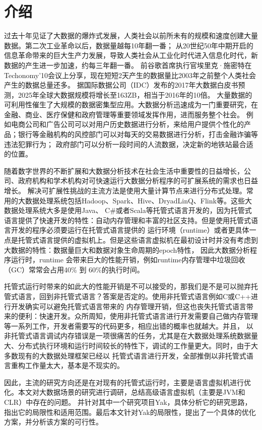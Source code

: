 
\chapter{介绍}
过去十年见证了大数据的爆炸式发展，人类社会以前所未有的规模和速度创建大量数据。第二次工业革命以后，数据量越每10年翻一番；
从20世纪50年中期开启的信息革命带来的巨大生产力发展，导致人类社会从工业化时代进入信息化时代，新数据的产生进一步加速，约每三年翻一番。
前谷歌首席执行官埃里克·施密特在Techonomy'10会议上分享，现在短短2天产生的数据量比2003年之前整个人类社会产生的数据总量还多。
据国际数据公司（IDC）发布的2017年大数据白皮书预测\cite{reinsel2017data}，2025年全球大数据规模将增长至163ZB，相当于2016年的10倍。
大量数据的可利用性催生了大规模的数据密集型应用。大数据分析迅速成为一门重要研究，在金融、商业、医疗保健和政府管理等重要领域发挥作用，进而服务整个社会。
例如电商公司和广告公司可以对用户历史数据进行分析，来给用户提供个性化的产品；银行等金融机构的风控部门可以对每天的交易数据进行分析，打击金融诈骗等违法犯罪行为；
政府部门可以分析一段时间的人流数据，决定新的地铁站最合适的位置。

随着数字世界的不断扩展和大数据分析技术在社会生活中重要性的日益增长，公司、政府机构和学术机构对可快速运行大数据分析程序的可扩展系统的需求也日益增长。
解决可扩展性挑战的主流方法是使用大量计算节点来进行分布式处理。常用的大数据处理系统包括Hadoop\cite{hadoop}、Spark\cite{spark}、Hive\cite{hive}、DryadLinQ\cite{dryadLinQ}、Flink\cite{flink}等。这些大数据处理系统大多是使用Java、
C\#或者Scala等托管式语言开发的，因为托管式语言提供了快速开发的特性：自动内存管理和丰富的社区支持。但是使用托管式语言开发的程序必须要运行在托管式语言提供的
运行环境（runtime）或者更具体一点是托管式语言提供的虚拟机上。但是这些语言虚拟机在最初设计时并没有考虑到大数据的特性：数据量巨大和数据对象生命周期的epoch特性\cite{nguyen2016yak}， 因此大数据分析程序运行时，runtime
会带来巨大的性能开销，例如runtime内存管理中垃圾回收（GC）常常会占用40\% 到 60\%的执行时间。

托管式运行时带来的如此大的性能开销是不可以接受的，那我们是不是可以抛弃托管式语言，回到非托管式语言？答案是否定的。使用非托管式语言例如C或C++进行开发确实可以避免托管式语言带来的
内存管理开销，但这也丧失托管式语言带来的便利：快速开发。众所周知，使用非托管式语言进行开发需要自己做内存管理等一系列工作，开发者需要写的代码更多，相应出错的概率也就越大。并且，
以非托管式语言调试内存错误是一项很痛苦的任务，尤其是在大数据处理系统数据量大、分布式执行环境和运行时间较长的特性下，调试的工作量更大。同时，由于大多数现有的大数据处理框架已经以
托管式语言进行开发，全部推倒以非托管式语言重构工作量太大，基本是不现实的。

因此，主流的研究方向还是在对现有的托管式运行时，主要是语言虚拟机进行优化。本文对大数据场景的研究进行调研，总结高级语言虚拟机（主要是JVM和CLR）中存在的问题。
并针对其中一个研究项目Yak\cite{nguyen2016yak}，具体分析它的研究思路，指出它的局限性和适用范围。最后本文针对Yak的局限性，提出了一个具体的优化方案，并分析该方案的可行性。






